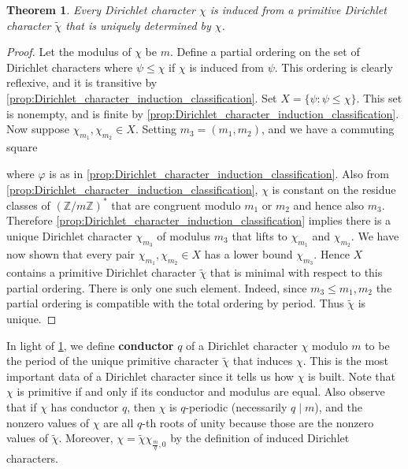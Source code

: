 \documentclass[12pt]{book}
\newtheorem{theorem}{Theorem}[section]
\theoremstyle{definition}\newframedtheorem{method}{Method}
\newcommand{\Z}{\mathbb{Z}}
\newcommand{\vphi}{\varphi}
\newcommand{\<}{\langle}
\renewcommand{\>}{\rangle}
\newcommand{\wtilde}{\widetilde}
\begin{document}
    \begin{theorem}\label{thm:Dirichlet_character_conductor_existance}
      Every Dirichlet character $\chi$ is induced from a primitive Dirichlet character $\wtilde{\chi}$ that is uniquely determined by $\chi$.
    \end{theorem}
    \begin{proof}
      Let the modulus of $\chi$ be $m$. Define a partial ordering on the set of Dirichlet characters where $\psi \le \chi$ if $\chi$ is induced from $\psi$. This ordering is clearly reflexive, and it is transitive by \cref{prop:Dirichlet_character_induction_classification}. Set $X = \{\psi:\psi \le \chi\}$. This set is nonempty, and is finite by \cref{prop:Dirichlet_character_induction_classification}. Now suppose $\chi_{m_{1}},\chi_{m_{2}} \in X$. Setting $m_{3} = (m_{1},m_{2})$, and we have a commuting square
      \begin{center}
      \end{center}
      where $\vphi$ is as in \cref{prop:Dirichlet_character_induction_classification}. Also from \cref{prop:Dirichlet_character_induction_classification}, $\chi$ is constant on the residue classes of $(\Z/m\Z)^{\ast}$ that are congruent modulo $m_{1}$ or $m_{2}$ and hence also $m_{3}$. Therefore \cref{prop:Dirichlet_character_induction_classification} implies there is a unique Dirichlet character $\chi_{m_{3}}$ of modulus $m_{3}$ that lifts to $\chi_{m_{1}}$ and $\chi_{m_{2}}$. We have now shown that every pair $\chi_{m_{1}},\chi_{m_{2}} \in X$ has a lower bound $\chi_{m_{3}}$. Hence $X$ contains a primitive Dirichlet character $\wtilde{\chi}$ that is minimal with respect to this partial ordering. There is only one such element. Indeed, since $m_{3} \le m_{1},m_{2}$ the partial ordering is compatible with the total ordering by period. Thus $\wtilde{\chi}$ is unique.
    \end{proof}

    In light of \cref{thm:Dirichlet_character_conductor_existance}, we define \textbf{conductor} $q$ of a Dirichlet character $\chi$ modulo $m$ to be the period of the unique primitive character $\wtilde{\chi}$ that induces $\chi$. This is the most important data of a Dirichlet character since it tells us how $\chi$ is built. Note that $\chi$ is primitive if and only if its conductor and modulus are equal. Also observe that if $\chi$ has conductor $q$, then $\chi$ is $q$-periodic (necessarily $q \mid m$), and the nonzero values of $\chi$ are all $q$-th roots of unity because those are the nonzero values of $\wtilde{\chi}$. Moreover, $\chi = \wtilde{\chi}\chi_{\frac{m}{q},0}$ by the definition of induced Dirichlet characters.
\end{document}
